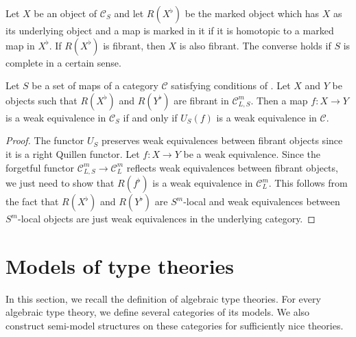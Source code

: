 \documentclass[reqno]{amsart}
\theoremstyle{definition}
\theoremstyle{remark}
\newcommand{\cat}[1]{\mathcal{#1}}
\newcommand{\C}{\cat{C}}
\numberwithin{figure}{section}
\begin{document}
Let $X$ be an object of $\C_S$ and let $R(X^\flat)$ be the marked object which has $X$ as its underlying object and a map is marked in it if it is homotopic to a marked map in $X^\flat$.
If $R(X^\flat)$ is fibrant, then $X$ is also fibrant.
The converse holds if $S$ is complete in a certain sense.

\begin{lem}[lift-we]
Let $S$ be a set of maps of a category $\C$ satisfying conditions of .
Let $X$ and $Y$ be objects such that $R(X^\flat)$ and $R(Y^\flat)$ are fibrant in $\C^m_{L,S}$.
Then a map $f : X \to Y$ is a weak equivalence in $\C_S$ if and only if $U_S(f)$ is a weak equivalence in $\C$.
\end{lem}
\begin{proof}

The functor $U_S$ preserves weak equivalences between fibrant objects since it is a right Quillen functor.
Let $f : X \to Y$ be a weak equivalence.
Since the forgetful functor $\C^m_{L,S} \to \C^m_L$ reflects weak equivalences between fibrant objects, we just need to show that $R(f^\flat)$ is a weak equivalence in $\C^m_L$.
This follows from the fact that $R(X^\flat)$ and $R(Y^\flat)$ are $S^m$-local and weak equivalences between $S^m$-local objects are just weak equivalences in the underlying category.
\end{proof}

\section{Models of type theories}

In this section, we recall the definition of algebraic type theories.
For every algebraic type theory, we define several categories of its models.
We also construct semi-model structures on these categories for sufficiently nice theories.
\end{document}
